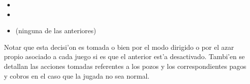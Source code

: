 \begin{itemize}
  \item {}
  \item {} 
  \item {} (ninguna de las anteriores)
\end{itemize}

Notar que esta decisi'on es tomada o bien por el modo dirigido o por el azar propio asociado a cada juego si es que el anterior est'a desactivado. Tambi'en se detallan las acciones tomadas referentes a los pozos y los correspondientes pagos y cobros en el caso que la jugada no sea normal.






